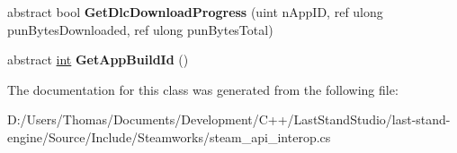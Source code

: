 \begin{DoxyCompactItemize}
\item 
\hypertarget{classValve_1_1Steamworks_1_1ISteamApps_acd2ca6d039e750934907100279ff166f}{}abstract bool {\bfseries Get\+Dlc\+Download\+Progress} (uint n\+App\+I\+D, ref ulong pun\+Bytes\+Downloaded, ref ulong pun\+Bytes\+Total)\label{classValve_1_1Steamworks_1_1ISteamApps_acd2ca6d039e750934907100279ff166f}

\item 
\hypertarget{classValve_1_1Steamworks_1_1ISteamApps_a44931c736316a7ea15879d888872b2aa}{}abstract \hyperlink{SDL__thread_8h_a6a64f9be4433e4de6e2f2f548cf3c08e}{int} {\bfseries Get\+App\+Build\+Id} ()\label{classValve_1_1Steamworks_1_1ISteamApps_a44931c736316a7ea15879d888872b2aa}

\end{DoxyCompactItemize}


The documentation for this class was generated from the following file\+:\begin{DoxyCompactItemize}
\item 
D\+:/\+Users/\+Thomas/\+Documents/\+Development/\+C++/\+Last\+Stand\+Studio/last-\/stand-\/engine/\+Source/\+Include/\+Steamworks/steam\+\_\+api\+\_\+interop.\+cs\end{DoxyCompactItemize}
